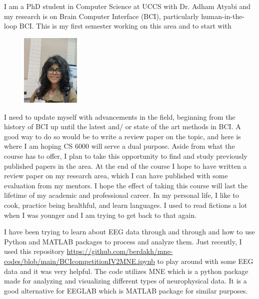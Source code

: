 

% 


I am a PhD student in Computer Science at UCCS with Dr. Adham Atyabi and my research is on Brain Computer Interface (BCI), particularly human-in-the-loop BCI. This is my first semester working on this area and to start with 
\begin{figure} %
    \centering
    \includegraphics[width=0.25\textwidth]{Raisa_Nusrat.jpg}
\end{figure}
I need to update myself with advancements in the field, beginning from the history of BCI up until the latest and/ or state of the art methods in BCI. A good way to do so would be to write a review paper on the topic, and here is where I am hoping CS 6000 will serve a dual purpose. Aside from what the course has to offer, I plan to take this opportunity to find and study previously published papers in the area. At the end of the course I hope to have written a review paper on my research area, which I can have published with some evaluation from my mentors. I hope the effect of taking this course will last the lifetime of my academic and professional career. In my personal life, I like to cook, practice being healthful, and learn languages. I used to read fictions a lot when I was younger and I am trying to get back to that again. 
\vspace{.25 cm}

I have been trying to learn about EEG data through and through and how to use Python and MATLAB packages to process and analyze them. Just recently, I used this repository \url{https://github.com/berdakh/mne-codes/blob/main/BCIcompetitionIV2MNE.ipynb} to play around with some EEG data and it was very helpful. The code utilizes MNE which is a python package made for analyzing and visualizing different types of neurophysical data. It is a good alternative for EEGLAB which is MATLAB package for similar purposes.


